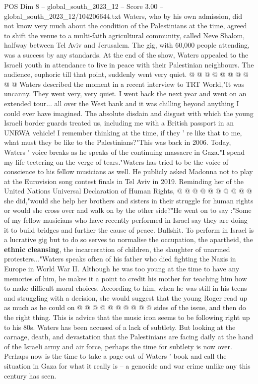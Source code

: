 \begin{textsample}{POS Dim 8 – global\_south\_2023\_12 – Score 3.00 – global\_south\_2023\_12/104206644.txt}
Waters, who by his own admission, did not know very much about the condition of the Palestinians at the time, agreed to shift the venue to a multi-faith agricultural community, called Neve Shalom, halfway between Tel Aviv and Jerusalem.
The gig, with 60,000 people attending, was a success by any standards.
At the end of the show, Waters appealed to the Israeli youth in attendance to live in peace with their Palestinian neighbours.
The audience, euphoric till that point, suddenly went very quiet. @ @ @ @ @ @ @ @ @ @ Waters described the moment in a recent interview to TRT World,"It was uncanny.
They went very, very quiet.
I went back the next year and went on an extended tour... all over the West bank and it was chilling beyond anything I could ever have imagined.
The absolute disdain and disgust with which the young Israeli border guards treated us, including me with a British passport in an UNRWA vehicle!
I remember thinking at the time, if they ' re like that to me, what must they be like to the Palestinians?"This was back in 2006.
Today, Waters ' voice breaks as he speaks of the continuing massacre in Gaza."I spend my life teetering on the verge of tears."Waters has tried to be the voice of conscience to his fellow musicians as well.
He publicly asked Madonna not to play at the Eurovision song contest finals in Tel Aviv in 2019.
Reminding her of the United Nations Universal Declaration of Human Rights, @ @ @ @ @ @ @ @ @ @ she did,"would she help her brothers and sisters in their struggle for human rights or would she cross over and walk on by the other side?"He went on to say :"Some of my fellow musicians who have recently performed in Israel say they are doing it to build bridges and further the cause of peace.
Bullshit.
To perform in Israel is a lucrative gig but to do so serves to normalise the occupation, the apartheid, the \textbf{ethnic} \textbf{cleansing}, the incarceration of children, the slaughter of unarmed protesters..."Waters speaks often of his father who died fighting the Nazis in Europe in World War II.
Although he was too young at the time to have any memories of him, he makes it a point to credit his mother for teaching him how to make difficult moral choices.
According to him, when he was still in his teens and struggling with a decision, she would suggest that the young Roger read up as much as he could on @ @ @ @ @ @ @ @ @ @ sides of the issue, and then do the right thing.
This is advice that the music icon seems to be following right up to his 80s.
Waters has been accused of a lack of subtlety.
But looking at the carnage, death, and devastation that the Palestinians are facing daily at the hand of the Israeli army and air force, perhaps the time for subtlety is now over.
Perhaps now is the time to take a page out of Waters ' book and call the situation in Gaza for what it really is -- a genocide and war crime unlike any this century has seen.

\end{textsample}
